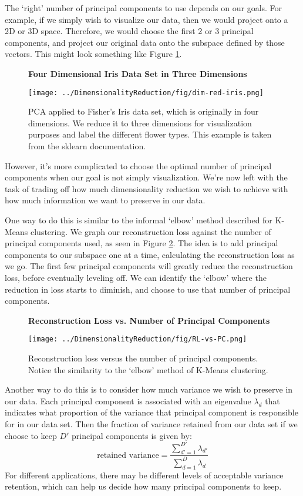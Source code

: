 The `right' number of principal components to use depends on our goals. For example, if we simply wish to visualize our data, then we would project onto a 2D or 3D space. Therefore, we would choose the first 2 or 3 principal components, and project our original data onto the subspace defined by those vectors. This might look something like Figure \ref{fig:dim-red-iris}.

\begin{figure}
    \centering
    \textbf{Four Dimensional Iris Data Set in Three Dimensions}\par\medskip
    \texttt{[image: ../DimensionalityReduction/fig/dim-red-iris.png]}
    \caption{PCA applied to Fisher's Iris data set, which is originally in four dimensions. We reduce it to three dimensions for visualization purposes and label the different flower types. This example is taken from the sklearn documentation.}
    \label{fig:dim-red-iris}
\end{figure}

However, it's more complicated to choose the optimal number of principal components when our goal is not simply visualization. We're now left with the task of trading off how much dimensionality reduction we wish to achieve with how much information we want to preserve in our data.

One way to do this is similar to the informal `elbow' method described for K-Means clustering. We graph our reconstruction loss against the number of principal components used, as seen in Figure \ref{fig:RL-vs-PC}. The idea is to add principal components to our subspace one at a time, calculating the reconstruction loss as we go. The first few principal components will greatly reduce the reconstruction loss, before eventually leveling off. We can identify the `elbow' where the reduction in loss starts to diminish, and choose to use that number of principal components.

\begin{figure}
    \centering
    \textbf{Reconstruction Loss vs. Number of Principal Components}\par\medskip
    \texttt{[image: ../DimensionalityReduction/fig/RL-vs-PC.png]}
    \caption{Reconstruction loss versus the number of principal components. Notice the similarity to the `elbow' method of K-Means clustering.}
    \label{fig:RL-vs-PC}
\end{figure}

Another way to do this is to consider how much variance we wish to preserve in our data. Each principal component is associated with an eigenvalue $\lambda_{d}$ that indicates what proportion of the variance that principal component is responsible for in our data set. Then the fraction of variance retained from our data set if we choose to keep $D'$ principal components is given by:
\begin{equation} \label{variance-retention}
    \text{retained variance} = \frac{\sum_{d'=1}^{D'} \lambda_{d'}}{\sum_{d=1}^{D} \lambda_{d}}
\end{equation}
For different applications, there may be different levels of acceptable variance retention, which can help us decide how many principal components to keep.


